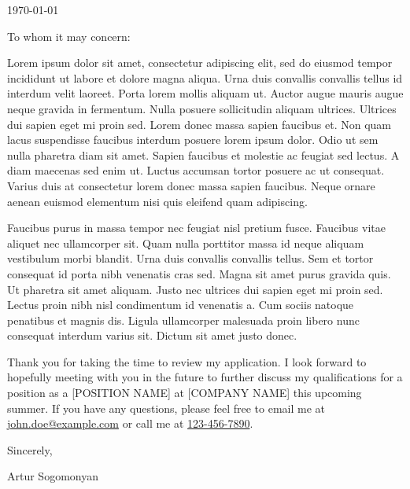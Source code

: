 \documentclass{ExpressiveCoverLetter}
\begin{document}
\coverletterheader[
    firstname=Artur,
    lastname=Sogomonyan,
    email=arthur.sogomonyan@gmail.com,
    phone=+43 677 64114581,
    linkedin=artur-sogomonyan,
    github=PropovedNik007,
    city=Vienna,
    state=Austria
]

\vspace{0.25in}
\today
\vspace{0.15in}


To whom it may concern:

Lorem ipsum dolor sit amet, consectetur adipiscing elit, sed do eiusmod
tempor incididunt ut labore et dolore magna aliqua. Urna duis convallis
convallis tellus id interdum velit laoreet. Porta lorem mollis aliquam
ut. Auctor augue mauris augue neque gravida in fermentum. Nulla posuere
sollicitudin aliquam ultrices. Ultrices dui sapien eget mi proin sed.
Lorem donec massa sapien faucibus et. Non quam lacus suspendisse
faucibus interdum posuere lorem ipsum dolor. Odio ut sem nulla pharetra
diam sit amet. Sapien faucibus et molestie ac feugiat sed lectus. A
diam maecenas sed enim ut. Luctus accumsan tortor posuere ac ut
consequat. Varius duis at consectetur lorem donec massa sapien
faucibus. Neque ornare aenean euismod elementum nisi quis eleifend quam
adipiscing.

Faucibus purus in massa tempor nec feugiat nisl pretium fusce. Faucibus
vitae aliquet nec ullamcorper sit. Quam nulla porttitor massa id neque
aliquam vestibulum morbi blandit. Urna duis convallis convallis tellus.
Sem et tortor consequat id porta nibh venenatis cras sed. Magna sit
amet purus gravida quis. Ut pharetra sit amet aliquam. Justo nec
ultrices dui sapien eget mi proin sed. Lectus proin nibh nisl
condimentum id venenatis a. Cum sociis natoque penatibus et magnis dis.
Ligula ullamcorper malesuada proin libero nunc consequat interdum
varius sit. Dictum sit amet justo donec.

Thank you for taking the time to review my application. I look forward
to hopefully meeting with you in the future to further discuss my
qualifications for a position as a [POSITION NAME] at [COMPANY NAME]
this upcoming summer. If you have any questions, please feel free to
email me at \href{mailto:john.doe@example.com}{john.doe@example.com} or
call me at \href{tel:+1-123-456-7890}{123-456-7890}.

Sincerely,

\vspace{.15in}

Artur Sogomonyan
\end{document}
